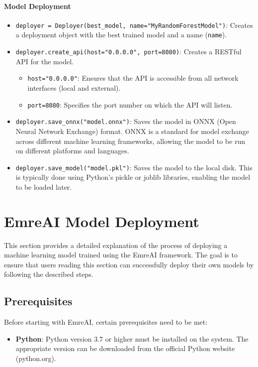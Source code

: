 \documentclass[conference]{IEEEtran}
\begin{document}
\paragraph{Model Deployment}

\begin{itemize}
    \item \texttt{deployer = Deployer(best\_model, name="MyRandomForestModel")}: Creates a deployment object with the best trained model and a name (\texttt{name}).
    \item \texttt{deployer.create\_api(host="0.0.0.0", port=8080)}: Creates a RESTful API for the model.
    \begin{itemize}
        \item \texttt{host="0.0.0.0"}: Ensures that the API is accessible from all network interfaces (local and external).
        \item \texttt{port=8080}: Specifies the port number on which the API will listen.
    \end{itemize}
    \item \texttt{deployer.save\_onnx("model.onnx")}: Saves the model in ONNX (Open Neural Network Exchange) format. ONNX is a standard for model exchange across different machine learning frameworks, allowing the model to be run on different platforms and languages.
    \item \texttt{deployer.save\_model("model.pkl")}: Saves the model to the local disk. This is typically done using Python's pickle or joblib libraries, enabling the model to be loaded later.
\end{itemize}


\section{EmreAI Model Deployment}

This section provides a detailed explanation of the process of deploying a machine learning model trained using the EmreAI framework. The goal is to ensure that users reading this section can successfully deploy their own models by following the described steps.

\subsection{Prerequisites}

Before starting with EmreAI, certain prerequisites need to be met:
\begin{itemize}
    \item \textbf{Python}: Python version 3.7 or higher must be installed on the system. The appropriate version can be downloaded from the official Python website (python.org).
\end{itemize}
\end{document}
